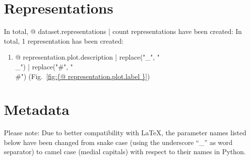 



\section{Representations}

In total, {@ dataset.representations | count } representations have been created:
In total, 1 representation has been created:

\begin{enumerate}
\item {@ representation.plot.description | replace("_", "\\_") | replace("#", "\\#") } (Fig.~\ref{fig:{@ representation.plot.label }})
\end{enumerate}




\clearpage


\section{Metadata}

Please note: Due to better compatibility with \LaTeX{}, the parameter names listed below have been changed from snake case (using the underscore \enquote{\_} as word separator) to camel case (medial capitals) with respect to their names in Python.




